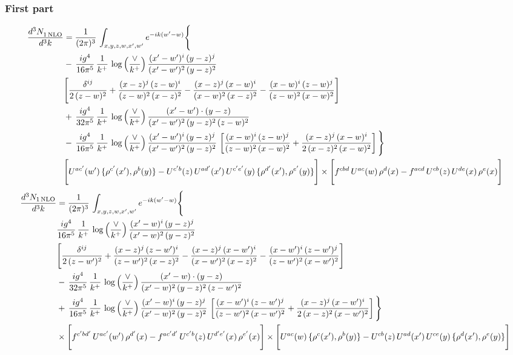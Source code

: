 \documentclass[9pt]{article}
\numberwithin{equation}{section}
\begin{document}
\subsubsection{First part}
\begin{align}
 \frac{d^{3}N_{1\,\rm NLO}^{\rm}}{d^{3}k}  & =     \frac{1}{(2\pi)^{3}}\,\int_{x,y,z,w,x',w^{\prime}} e^{-ik(w^{\prime}-w)}\Bigg\{\notag \\
& -\, \frac{ig^{4}}{16\pi^{5}}\,\frac{1}{k^{+}}\,\log{\left(\frac{\vee}{k^{+}}\right)}\, \frac{(x'-w')^{i}\,(y-z)^{j}}{(x'-w')^{2}\,(y-z)^{2}}\notag \\ &  \Bigg[\frac{\delta^{ij}}{2\,(z-w)^{2}}+\frac{(x-z)^{j}\,(z-w)^{i}}{(z-w)^{2}\,(x-z)^{2}}-\frac{(x-z)^{j}\,(x-w)^{i}}{(x-w)^{2}\,(x-z)^{2}}-\frac{(x-w)^{i}\,(z-w)^{j}}{(z-w)^{2}\,(x-w)^{2}}\Bigg] \notag \\
& +\,\frac{ig^{4}}{32\pi^{5}}\,\frac{1}{k^{+}}\,\log{\left(\frac{\vee}{k^{+}}\right)}\, \frac{(x'-w')\cdot (y-z)}{(x'-w')^{2}\,(y-z)^{2}\,(z-w)^{2}} \notag \\
& -\, \frac{ig^{4}}{16\pi^{5}}\,\frac{1}{k^{+}}\,\log{\left(\frac{\vee}{k^{+}}\right)}\,\frac{(x'-w')^{i}\,(y-z)^{j}}{(x'-w')^{2}\,(y-z)^{2}}\,\left[\frac{(x-w)^{i}\,(z-w)^{j}}{(z-w)^{2}\,(x-w)^{2}}+\frac{(x-z)^{j}\,(x-w)^{i}}{2\,(x-z)^{2}\, (x-w)^{2}}\right]\Bigg\} \notag \\ & \Bigg[U^{ac'}(w')\,\{\rho^{c'}(x'),\rho^{b}(y)\}-U^{c'b}(z)\,U^{ad'}(x')\,U^{c'e'}(y)\, \{\rho^{d'}(x'),\rho^{e'}(y)\}\Bigg]\times \Bigg[f^{cbd}\,U^{ac}(w)\,\rho^{d}(x)-f^{acd}\, U^{cb}(z)\,U^{de}(x)\,\rho^{e}(x)\Bigg]
\end{align}
\begin{align}
\frac{d^{3}N_{1\,\rm NLO}}{d^{3}k} & =  \frac{1}{(2\pi)^{3}}\,\int_{x,y,z,w,x',w^{\prime}} e^{-ik(w^{\prime}-w)}\Bigg\{\notag \\
&  \frac{ig^{4}}{16\pi^{5}}\,\frac{1}{k^{+}}\,\log{\left(\frac{\vee}{k^{+}}\right)}\, \frac{(x'-w)^{i}\,(y-z)^{j}}{(x'-w)^{2}\,(y-z)^{2}}\notag \\ &  \Bigg[\frac{\delta^{ij}}{2\,(z-w')^{2}}+\frac{(x-z)^{j}\,(z-w')^{i}}{(z-w')^{2}\,(x-z)^{2}}-\frac{(x-z)^{j}\,(x-w')^{i}}{(x-w')^{2}\,(x-z)^{2}}-\frac{(x-w')^{i}\,(z-w')^{j}}{(z-w')^{2}\,(x-w')^{2}}\Bigg] \notag \\
& -\,\frac{ig^{4}}{32\pi^{5}}\,\frac{1}{k^{+}}\,\log{\left(\frac{\vee}{k^{+}}\right)}\, \frac{(x'-w)\cdot (y-z)}{(x'-w)^{2}\,(y-z)^{2}\,(z-w')^{2}} \notag \\
& +\,\frac{ig^{4}}{16\pi^{5}}\,\frac{1}{k^{+}}\,\log{\left(\frac{\vee}{k^{+}}\right)}\,\frac{(x'-w)^{i}\,(y-z)^{j}}{(x'-w)^{2}\,(y-z)^{2}}\,\left[\frac{(x-w')^{i}\,(z-w')^{j}}{(z-w')^{2}\,(x-w')^{2}}+\frac{(x-z)^{j}\,(x-w')^{i}}{2\,(x-z)^{2}\, (x-w')^{2}}\right]\Bigg\} \notag \\ & \times\Bigg[f^{c'bd'}\,U^{ac'}(w')\,\rho^{d'}(x)-f^{ac'd'}\, U^{c'b}(z)\,U^{d'e'}(x)\,\rho^{e'}(x)\Bigg] \times \Bigg[U^{ac}(w)\,\{\rho^{c}(x'),\rho^{b}(y)\}-U^{cb}(z)\,U^{ad}(x')\,U^{ce}(y)\, \{\rho^{d}(x'),\rho^{e}(y)\}\Bigg]
    \end{align}
\end{document}

